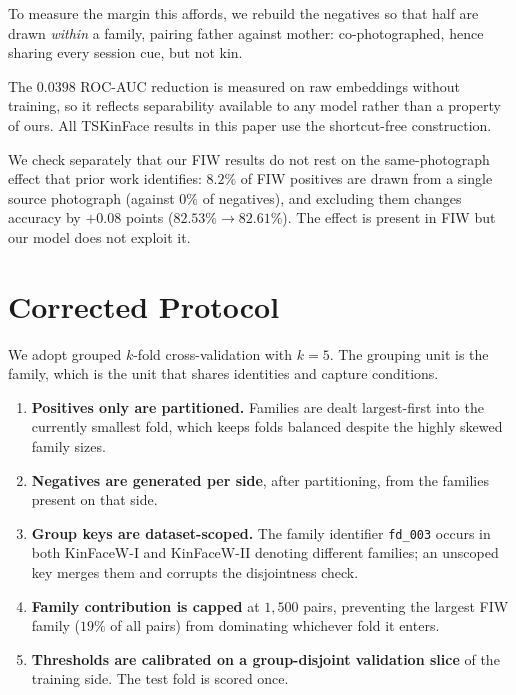 \documentclass[preprint,12pt]{elsarticle}
\begin{document}
To measure the margin this affords, we rebuild the negatives so that half are
drawn \emph{within} a family, pairing father against mother: co-photographed,
hence sharing every session cue, but not kin.

\begin{table}[t]
\caption{TSKinFace pair construction. Under the standard protocol family
membership predicts the label perfectly; no pair shares a source photograph in
either construction.}
\label{tab:ts}
\centering
{}
\end{table}

The $0.0398$ ROC-AUC reduction is measured on raw embeddings without training,
so it reflects separability available to any model rather than a property of
ours. All TSKinFace results in this paper use the shortcut-free construction.

We check separately that our FIW results do not rest on the same-photograph
effect that prior work identifies: $8.2\%$ of FIW positives are drawn from a
single source photograph (against $0\%$ of negatives), and excluding them
changes accuracy by $+0.08$ points ($82.53\% \to 82.61\%$). The effect is
present in FIW but our model does not exploit it.

\section{Corrected Protocol}
\label{sec:protocol}

We adopt grouped $k$-fold cross-validation with $k=5$. The grouping unit is the
family, which is the unit that shares identities and capture conditions.

\begin{enumerate}
\item \textbf{Positives only are partitioned.} Families are dealt largest-first
into the currently smallest fold, which keeps folds balanced despite the highly
skewed family sizes.
\item \textbf{Negatives are generated per side}, after partitioning, from the
families present on that side.
\item \textbf{Group keys are dataset-scoped.} The family identifier
\texttt{fd\_003} occurs in both KinFaceW-I and KinFaceW-II denoting different
families; an unscoped key merges them and corrupts the disjointness check.
\item \textbf{Family contribution is capped} at $1{,}500$ pairs, preventing the
largest FIW family ($19\%$ of all pairs) from dominating whichever fold it
enters.
\item \textbf{Thresholds are calibrated on a group-disjoint validation slice} of
the training side. The test fold is scored once.
\end{enumerate}
\end{document}

